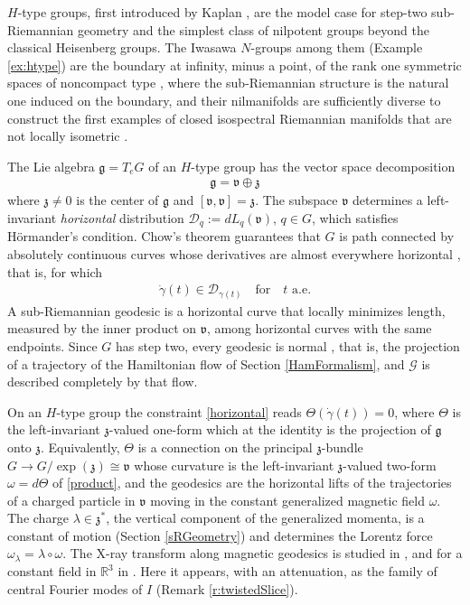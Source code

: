 \documentclass[11pt]{amsart}
\theoremstyle{plain}
\theoremstyle{definition}
\theoremstyle{remark}
\numberwithin{equation}{section}
\def\fz{\mathfrak{z}}
\def\fg{\mathfrak{g}}
\def\fv{\mathfrak{v}}
\def\cG{\mathcal{G}}
\def\cD{\mathcal{D}}
\def\R{{\mathbb R}}%
\numberwithin{equation}{section}
\begin{document}
$H$-type groups, first introduced by Kaplan \cite{kaplanFundamentalSolutionsClass1980, kaplanRiemannianNilmanifoldsAttached1981}, are the model case for step-two sub-Riemannian geometry and the simplest class of nilpotent groups beyond the classical Heisenberg groups. The Iwasawa $N$-groups among them (Example \ref{ex:htype}) are the boundary at infinity, minus a point, of the rank one symmetric spaces of noncompact type \cite{follandHardySpacesHomogeneous1982b, cowlingHTypeGroupsLwasawa}, where the sub-Riemannian structure is the natural one induced on the boundary, and their nilmanifolds are sufficiently diverse to construct the first examples of closed isospectral Riemannian manifolds that are not locally isometric \cite{gordonIsospectralClosedRiemannian1993}.

The Lie algebra $\fg=T_eG$ of an $H$-type group has the vector space decomposition
\begin{align*}
	\fg=\fv\oplus \fz
\end{align*}
where $\fz\neq 0$ is the center of $\fg$ and $[\fv, \fv]=\fz$. The subspace $\fv$ determines a left-invariant \textit{horizontal} distribution $\cD_q:=dL_q(\fv)$, $q\in G$, which satisfies H\"{o}rmander's condition. Chow's theorem guarantees that $G$ is path connected by absolutely continuous curves whose derivatives are almost everywhere horizontal \cite{montgomeryTourSubriemannianGeometries2006}, that is, for which
\begin{align}\label{horizontal}
	\dot{\gamma}(t)\in \cD_{\gamma(t)} \quad \text{for} \quad t \text{ a.e.}
\end{align}
A sub-Riemannian geodesic is a horizontal curve that locally minimizes length, measured by the inner product on $\fv$, among horizontal curves with the same endpoints. Since $G$ has step two, every geodesic is normal \cite{montgomeryTourSubriemannianGeometries2006}, that is, the projection of a trajectory of the Hamiltonian flow of Section \ref{HamFormalism}, and $\cG$ is described completely by that flow.

On an $H$-type group the constraint \eqref{horizontal} reads $\Theta(\dot\gamma(t))=0$, where $\Theta$ is the left-invariant $\fz$-valued one-form which at the identity is the projection of $\fg$ onto $\fz$. Equivalently, $\Theta$ is a connection on the principal $\fz$-bundle $G\to G/\exp(\fz)\cong\fv$ whose curvature is the left-invariant $\fz$-valued two-form $\omega=d\Theta$ of \eqref{product}, and the geodesics are the horizontal lifts of the trajectories of a charged particle in $\fv$ moving in the constant generalized magnetic field $\omega$. The charge $\lambda\in \fz^*$, the vertical component of the generalized momenta,  is a constant of motion (Section \ref{sRGeometry}) and determines the Lorentz force $\omega_\lambda=\lambda\circ\omega$. The X-ray transform along magnetic geodesics is studied in \cite{dairbekovBoundaryRigidityMagnetic2007}, and for a constant field in $\R^3$ in \cite[Section 10.3]{stefanovGeodesicXrayTransform2012}. Here it appears, with an attenuation, as the family of central Fourier modes of $I$ (Remark \ref{r:twistedSlice}). 
\end{document}

